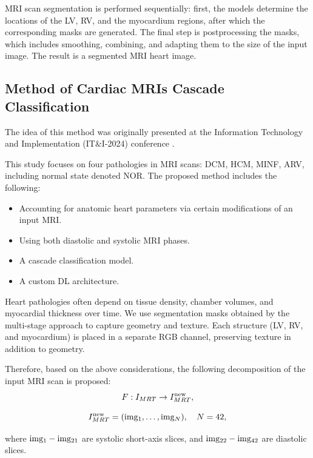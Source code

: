 \documentclass[fleqn,10pt]{wlscirep}
\begin{document}
MRI scan segmentation is performed sequentially: first, the models determine the locations of the LV, RV, and the myocardium regions, after which the corresponding masks are generated. The final step is postprocessing the masks, which includes smoothing, combining, and adapting them to the size of the input image. The result is a segmented MRI heart image.

\subsection*{Method of Cardiac MRIs Cascade Classification}

The idea of this method was originally presented at the Information Technology and Implementation (IT\&I-2024) conference \cite{Slobodzian:2025}.

This study focuses on four pathologies in MRI scans: DCM, HCM, MINF, ARV, including normal state denoted NOR. The proposed method includes the following:

\begin{itemize}
    \item Accounting for anatomic heart parameters via certain modifications of an input MRI.
    \item Using both diastolic and systolic MRI phases.
    \item A cascade classification model.
    \item A custom DL architecture.
\end{itemize}

Heart pathologies often depend on tissue density, chamber volumes, and myocardial thickness over time. We use segmentation masks obtained by the multi-stage approach to capture geometry and texture. Each structure (LV, RV, and myocardium) is placed in a separate RGB channel, preserving texture in addition to geometry.

Therefore, based on the above considerations, the following decomposition of the input MRI scan is proposed:
\begin{equation}
    F:{I_{MRT}} \to I_{MRT}^{{\rm{new}}},
\end{equation}

\begin{equation}
    I_{MRT}^{{\rm{new}}} = ({\rm{im}}{{\rm{g}}_1}, \ldots ,{\rm{im}}{{\rm{g}}_N}),\quad N = 42,
\end{equation}

where \({\rm{im}}{{\rm{g}}_1} - {\rm{im}}{{\rm{g}}_{21}}\) are systolic short-axis slices, and \({\rm{im}}{{\rm{g}}_{22}} - {\rm{im}}{{\rm{g}}_{42}}\) are diastolic slices.
\end{document}
